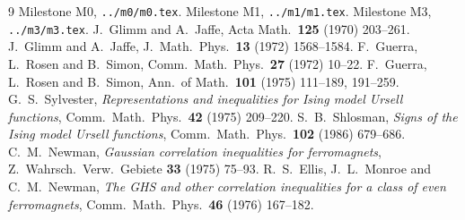 \documentclass[11pt,a4paper]{article}
\theoremstyle{plain}
\theoremstyle{definition}
\begin{document}
\begin{thebibliography}{9}
 Milestone M0, \texttt{../m0/m0.tex}.
 Milestone M1, \texttt{../m1/m1.tex}.
 Milestone M3, \texttt{../m3/m3.tex}.
 J.~Glimm and A.~Jaffe, Acta Math.\ \textbf{125} (1970) 203--261.
 J.~Glimm and A.~Jaffe, J.\ Math.\ Phys.\ \textbf{13} (1972) 1568--1584.
 F.~Guerra, L.~Rosen and B.~Simon, Comm.\ Math.\ Phys.\ \textbf{27} (1972) 10--22.
 F.~Guerra, L.~Rosen and B.~Simon, Ann.\ of Math.\ \textbf{101} (1975) 111--189,
191--259.
 G.~S.~Sylvester, \emph{Representations and inequalities for Ising model Ursell
functions}, Comm.\ Math.\ Phys.\ \textbf{42} (1975) 209--220.
 S.~B.~Shlosman, \emph{Signs of the Ising model Ursell functions}, Comm.\ Math.\
Phys.\ \textbf{102} (1986) 679--686.
 C.~M.~Newman, \emph{Gaussian correlation inequalities for ferromagnets},
Z.\ Wahrsch.\ Verw.\ Gebiete \textbf{33} (1975) 75--93.
 R.~S.~Ellis, J.~L.~Monroe and C.~M.~Newman, \emph{The GHS and other correlation
inequalities for a class of even ferromagnets}, Comm.\ Math.\ Phys.\ \textbf{46} (1976) 167--182.
\end{thebibliography}
\end{document}
